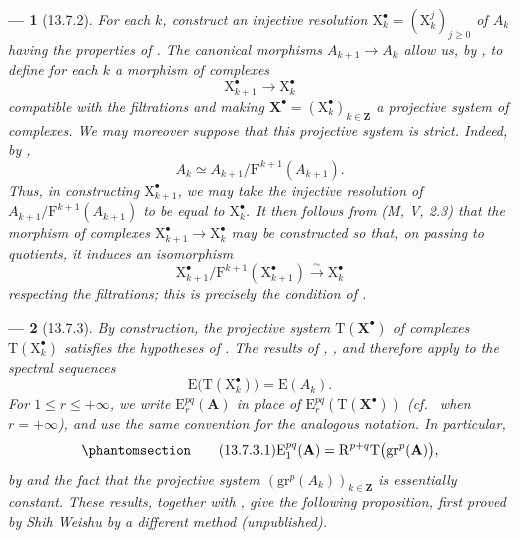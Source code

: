 \documentclass[oneside]{amsart}
\theoremstyle{ega-env-style}
\newtheorem*{env}{---}
\theoremstyle{ega-thm-env-style}
\theoremstyle{ega-defn-env-style}
\def\bb{\mathbf}                    %
\def\leq{\leqslant}                 %
\def\geq{\geqslant}                 %
\def\RR{\mathrm{R}}                 %
\def\simto{\xrightarrow{\sim}}
\newcommand{\oldpage}[2][]{{\marginnote{\normalfont{\textbf{#1}~|~#2}}}\ignorespaces}
\let\EGAOriginalLabel\label
\renewcommand{\label}[1]{\phantomsection\EGAOriginalLabel{#1}}
\begin{document}
\begin{env}[13.7.2]
\label{0.13.7.2}
For each $k$, construct an injective resolution
$\mathrm{X}_k^\bullet=(\mathrm{X}_k^j)_{j\geq0}$ of $A_k$ having the
properties of .
The canonical morphisms $A_{k+1}\longrightarrow A_k$ allow us, by
, to define for each $k$ a morphism of complexes
\[
  \mathrm{X}_{k+1}^\bullet\longrightarrow\mathrm{X}_k^\bullet
\]
compatible with the filtrations and making
$\bb{X}^\bullet=(\mathrm{X}_k^\bullet)_{k\in\bb{Z}}$ a projective
system of complexes.
\oldpage[0\textsubscript{III}]{76}
We may moreover suppose that this projective system is strict.
Indeed, by ,
\[
  A_k
  \simeq
  A_{k+1}/\mathrm{F}^{k+1}(A_{k+1}).
\]
Thus, in constructing $\mathrm{X}_{k+1}^\bullet$, we may take the
injective resolution of
$A_{k+1}/\mathrm{F}^{k+1}(A_{k+1})$ to be
\emph{equal} to $\mathrm{X}_k^\bullet$.
It then follows from (M, V, 2.3) that the morphism of complexes
$\mathrm{X}_{k+1}^\bullet\longrightarrow\mathrm{X}_k^\bullet$ may be
constructed so that, on passing to quotients, it induces an
isomorphism
\[
  \mathrm{X}_{k+1}^\bullet/
  \mathrm{F}^{k+1}(\mathrm{X}_{k+1}^\bullet)
  \simto
  \mathrm{X}_k^\bullet
\]
respecting the filtrations; this is precisely the condition of
.
\end{env}

\begin{env}[13.7.3]
\label{0.13.7.3}
By construction, the projective system
$\mathrm{T}(\bb{X}^\bullet)$ of complexes
$\mathrm{T}(\mathrm{X}_k^\bullet)$ satisfies the hypotheses of
.
The results of , , and
 therefore apply to the spectral sequences
\[
  \mathrm{E}\bigl(\mathrm{T}(\mathrm{X}_k^\bullet)\bigr)
  =
  \mathrm{E}(A_k).
\]
For $1\leq r\leq+\infty$, we write
$\mathrm{E}_r^{pq}(\bb{A})$ in place of
$\mathrm{E}_r^{pq}(\mathrm{T}(\bb{X}^\bullet))$
(cf.\  when $r=+\infty$), and use the same convention
for the analogous notation.
In particular,
\begin{equation}
\label{0.13.7.3.1}
\tag{13.7.3.1}
  \mathrm{E}_1^{pq}(\bb{A})
  =
  \RR^{p+q}\mathrm{T}\bigl(\mathrm{gr}^p(\bb{A})\bigr),
\end{equation}
by  and the fact that the projective system
$(\mathrm{gr}^p(A_k))_{k\in\bb{Z}}$ is essentially constant.
These results, together with , give the following
proposition, first proved by Shih Weishu by a different method
(unpublished).
\end{env}
\end{document}
